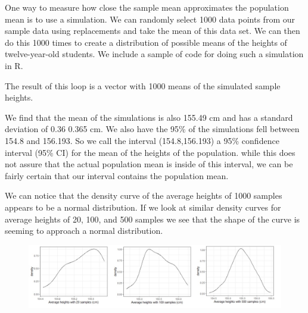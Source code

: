\documentclass[
]{book}
\newenvironment{Shaded}{\begin{snugshade}}{\end{snugshade}}
\newcommand{\AttributeTok}[1]{\textcolor[rgb]{0.77,0.63,0.00}{#1}}
\newcommand{\CommentTok}[1]{\textcolor[rgb]{0.56,0.35,0.01}{\textit{#1}}}
\newcommand{\ConstantTok}[1]{\textcolor[rgb]{0.00,0.00,0.00}{#1}}
\newcommand{\ControlFlowTok}[1]{\textcolor[rgb]{0.13,0.29,0.53}{\textbf{#1}}}
\newcommand{\DecValTok}[1]{\textcolor[rgb]{0.00,0.00,0.81}{#1}}
\newcommand{\FunctionTok}[1]{\textcolor[rgb]{0.00,0.00,0.00}{#1}}
\newcommand{\NormalTok}[1]{#1}
\newcommand{\OtherTok}[1]{\textcolor[rgb]{0.56,0.35,0.01}{#1}}
\newcommand{\SpecialCharTok}[1]{\textcolor[rgb]{0.00,0.00,0.00}{#1}}
\theoremstyle{definition}
\theoremstyle{definition}
\theoremstyle{definition}
\theoremstyle{definition}
\theoremstyle{remark}
\begin{document}
One way to measure how close the sample mean approximates the population mean is to use a simulation. We can randomly select 1000 data points from our sample data using replacements and take the mean of this data set. We can then do this 1000 times to create a distribution of possible means of the heights of twelve-year-old students. We include a sample of code for doing such a simulation in R.

\begin{Shaded}
\end{Shaded}

The result of this loop is a vector with 1000 means of the simulated sample heights.

We find that the mean of the simulations is also 155.49 cm and has a standard deviation of 0.36 0.365 cm. We also have the 95\% of the simulations fell between 154.8 and 156.193. So we call the interval (154.8,156.193) a 95\% confidence interval (95\% CI) for the mean of the heights of the population. while this does not assure that the actual population mean is inside of this interval, we can be fairly certain that our interval contains the population mean.

We can notice that the density curve of the average heights of 1000 samples appears to be a normal distribution. If we look at similar density curves for average heights of 20, 100, and 500 samples we see that the shape of the curve is seeming to approach a normal distribution.

\begin{figure}

{\centering \includegraphics[width=1\linewidth]{images/heights_averages} 

}

\end{figure}
\end{document}
